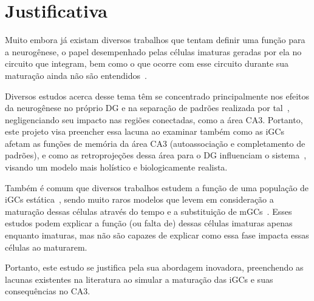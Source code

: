 \chapter{Justificativa}

Muito embora já existam diversos trabalhos que tentam definir uma função para a neurogênese, o papel desempenhado pelas células
imaturas geradas por ela no circuito que integram, bem como o que ocorre com esse circuito durante sua maturação ainda não são
entendidos~\cite{aimoneComputational2016, aimoneModeling2011, berdugo-vegaSharpening2023, faresNeurogenesis2019}.

Diversos estudos acerca desse tema têm se concentrado principalmente nos efeitos da neurogênese no próprio DG e na separação de
padrões realizada por tal~\cite{berdugo-vegaSharpening2023, kimAdult2024,wangEffect2024}, negligenciando seu impacto nas regiões
conectadas, como a área CA3. Portanto, este projeto visa preencher essa lacuna ao examinar também como as iGCs afetam as funções
de memória da área CA3 (autoassociação e completamento de padrões), e como as retroprojeções dessa área para o DG influenciam o
sistema~\cite{myersPattern2011}, visando um modelo mais holístico e biologicamente realista.

Também é comum que diversos trabalhos estudem a função de uma população de iGCs estática~\cite{aimoneComputational2016,
berdugo-vegaSharpening2023}, sendo muito raros modelos que levem em consideração a maturação dessas células através do tempo e a
substituição de mGCs~\cite{aimoneComputational2009}. Esses estudos podem explicar a função (ou falta de) dessas células imaturas
apenas enquanto imaturas, mas não são capazes de explicar como essa fase impacta essas células ao maturarem.

Portanto, este estudo se justifica pela sua abordagem inovadora, preenchendo as lacunas existentes na literatura ao
simular a maturação das iGCs e suas consequências no CA3.


